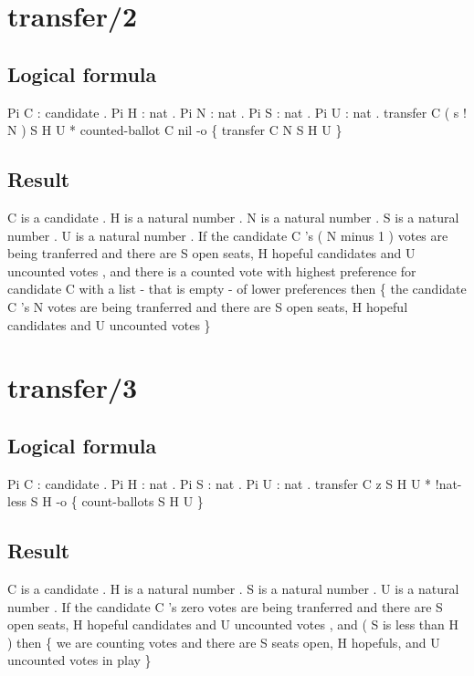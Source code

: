 \section{transfer/2}
\subsection{Logical formula}
\begin{texto2}
	Pi C : candidate . Pi H : nat . Pi N : nat . Pi S : nat . Pi U : nat . transfer C ( s ! N ) S H U * counted-ballot C nil -o \{  transfer C N S H U  \}
\end{texto2}

\subsection{Result}
\begin{texto2}
	C is a candidate . H is a natural number . N is a natural number . S is a natural number . U is a natural number . If the candidate C 's ( N minus 1 ) votes are being tranferred and there are S open seats, H hopeful candidates and U uncounted votes , and there is a counted vote with highest preference for candidate C with a list - that is empty - of lower preferences then \{ the candidate C 's N votes are being tranferred and there are S open seats, H hopeful candidates and U uncounted votes \}
\end{texto2}

\section{transfer/3}
\subsection{Logical formula}
\begin{texto2}
	Pi C : candidate . Pi H : nat . Pi S : nat . Pi U : nat . transfer C z S H U * !nat-less S H -o \{ count-ballots S H U \}
\end{texto2}

\subsection{Result}
\begin{texto2}
	C is a candidate . H is a natural number . S is a natural number . U is a natural number . If the candidate C 's zero votes are being tranferred and there are S open seats, H hopeful candidates and U uncounted votes , and ( S is less than H ) then \{ we are counting votes and there are S seats open, H hopefuls, and U uncounted votes in play \}
\end{texto2}

